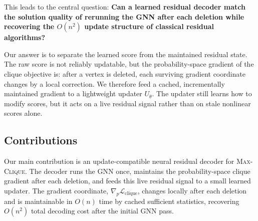 \documentclass[mathematics,article,submit,pdftex,moreauthors]{Definitions/mdpi}
\begin{document}
This leads to the central question: \textbf{Can a learned residual decoder match
  the solution quality of rerunning the GNN after each deletion while recovering the
$O(n^2)$ update structure of classical residual algorithms?}

Our answer is to separate the learned score from the maintained residual state. The
raw score is not reliably updatable, but the probability-space gradient of the clique
objective is: after a vertex is deleted, each surviving gradient coordinate changes
by a local correction. We therefore feed a cached, incrementally maintained gradient
to a lightweight updater $U_\theta$. The updater still learns how to modify scores,
but it acts on a live residual signal rather than on stale nonlinear scores alone.

\subsection{Contributions}

Our main contribution is an update-compatible neural residual decoder for
\textsc{Max-Clique}. The decoder runs the GNN once, maintains the probability-space
clique gradient after each deletion, and feeds this live residual signal to a small
learned updater. The gradient coordinate,
$\nabla_p\mathcal{L}_{\mathrm{clique}}$, changes locally after each deletion and is
maintainable in $O(n)$ time by cached sufficient statistics, recovering $O(n^2)$
total decoding cost after the initial GNN pass.
\end{document}
